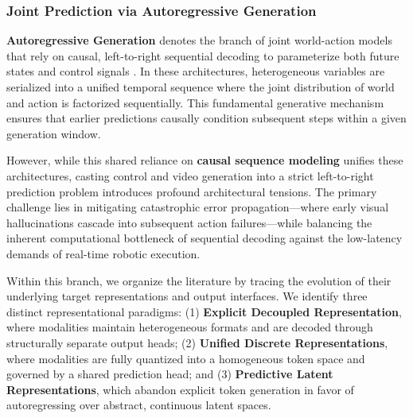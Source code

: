 \subsubsection{Joint Prediction via Autoregressive Generation}
\label{sec:joint_discerte}

\textbf{Autoregressive Generation} denotes the branch of joint world-action models that rely on causal, left-to-right sequential decoding to parameterize both future states and control signals \cite{GR1, grmg, GR2, CoTVLA, WorldVLA, rynnvla2, VLA-JEPA}. In these architectures, heterogeneous variables are serialized into a unified temporal sequence where the joint distribution of world and action is factorized sequentially. This fundamental generative mechanism ensures that earlier predictions causally condition subsequent steps within a given generation window.

However, while this shared reliance on \textbf{causal sequence modeling} unifies these architectures, casting control and video generation into a strict left-to-right prediction problem introduces profound architectural tensions. The primary challenge lies in mitigating catastrophic error propagation—where early visual hallucinations cascade into subsequent action failures—while balancing the inherent computational bottleneck of sequential decoding against the low-latency demands of real-time robotic execution.



Within this branch, we organize the literature by tracing the evolution of their underlying target representations and output interfaces. We identify three distinct representational paradigms: (1) \textbf{Explicit Decoupled Representation}, where modalities maintain heterogeneous formats and are decoded through structurally separate output heads; (2) \textbf{Unified Discrete Representations}, where modalities are fully quantized into a homogeneous token space and governed by a shared prediction head; and (3) \textbf{Predictive Latent Representations}, which abandon explicit token generation in favor of autoregressing over abstract, continuous latent spaces.





